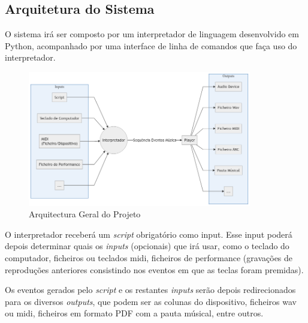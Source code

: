 \documentclass[
  oneside,
  11pt, a4paper,
  footinclude=true,
  headinclude=true,
  cleardoublepage=empty
]{scrbook}
\begin{document}
    \subsection{Arquitetura do Sistema}
    O sistema irá ser composto por um interpretador de linguagem desenvolvido em Python, acompanhado por uma interface de linha de comandos que faça uso do interpretador.
	\begin{figure}[h]
	\begin{center}
		\includegraphics[width=0.87\textwidth]{img/diagram_architecture.png}
	\end{center}
	\caption{Arquitectura Geral do Projeto}
	\end{figure}
	
	O interpretador receberá um \textit{script} obrigatório como input. Esse input poderá depois determinar quais os \textit{inputs} (opcionais) que irá usar, como o teclado do computador, ficheiros ou teclados \acrshort{midi}, ficheiros de performance (gravações de reproduções anteriores consistindo nos eventos em que as teclas foram premidas).
	
	Os eventos gerados pelo \textit{script} e os restantes \textit{inputs} serão depois redirecionados para os diversos \textit{outputs}, que podem ser as colunas do dispositivo, ficheiros \acrshort{wav} ou \acrshort{midi}, ficheiros em formato PDF com a pauta músical, entre outros.
	
\end{document}
